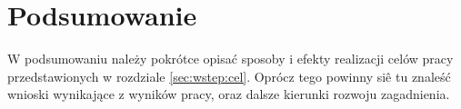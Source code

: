 
\chapter{Podsumowanie}
\label{sec:podsumowanie}

W podsumowaniu należy pokrótce opisać sposoby i efekty realizacji celów pracy przedstawionych w rozdziale \ref{sec:wstep:cel}. Oprócz tego powinny siê tu znaleść wnioski wynikające z wyników pracy, oraz dalsze kierunki rozwoju zagadnienia.
